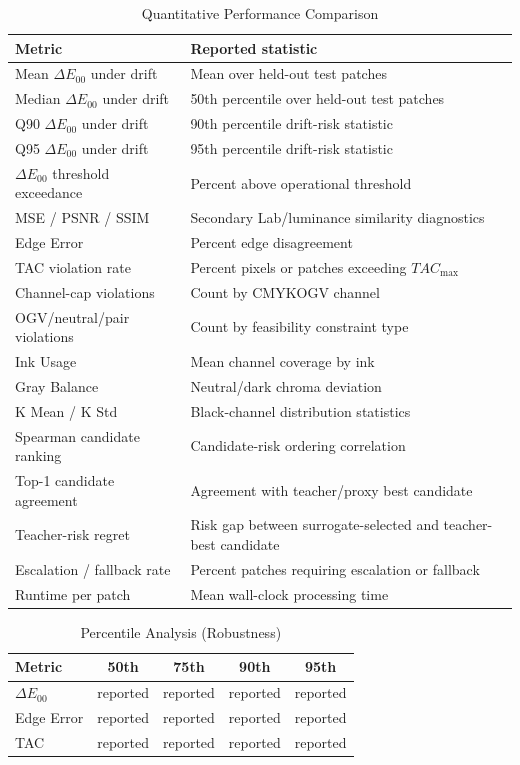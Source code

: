 \documentclass[acmsmall,screen,nonacm]{acmart}
\begin{document}
\begin{table}[htbp]
\centering
\caption{Quantitative Performance Comparison}
\label{tab:quant_results}
\begin{tabular}{p{}p{}}
\toprule
Metric & Reported statistic \\
\midrule
Mean $\Delta E_{00}$ under drift & Mean over held-out test patches \\
Median $\Delta E_{00}$ under drift & 50th percentile over held-out test patches \\
Q90 $\Delta E_{00}$ under drift & 90th percentile drift-risk statistic \\
Q95 $\Delta E_{00}$ under drift & 95th percentile drift-risk statistic \\
$\Delta E_{00}$ threshold exceedance & Percent above operational threshold \\
MSE / PSNR / SSIM & Secondary Lab/luminance similarity diagnostics \\
Edge Error & Percent edge disagreement \\
TAC violation rate & Percent pixels or patches exceeding $TAC_{\max}$ \\
Channel-cap violations & Count by CMYKOGV channel \\
OGV/neutral/pair violations & Count by feasibility constraint type \\
Ink Usage & Mean channel coverage by ink \\
Gray Balance & Neutral/dark chroma deviation \\
K Mean / K Std & Black-channel distribution statistics \\
Spearman candidate ranking & Candidate-risk ordering correlation \\
Top-1 candidate agreement & Agreement with teacher/proxy best candidate \\
Teacher-risk regret & Risk gap between surrogate-selected and teacher-best candidate \\
Escalation / fallback rate & Percent patches requiring escalation or fallback \\
Runtime per patch & Mean wall-clock processing time \\
\bottomrule
\end{tabular}
\end{table}

\begin{table}[htbp]
\centering
\caption{Percentile Analysis (Robustness)}
\label{tab:percentile_robustness}
\begin{tabular}{lcccc}
\toprule
Metric & 50th & 75th & 90th & 95th \\
\midrule
$\Delta E_{00}$ & reported & reported & reported & reported \\
Edge Error & reported & reported & reported & reported \\
TAC & reported & reported & reported & reported \\
\bottomrule
\end{tabular}
\end{table}
\end{document}
